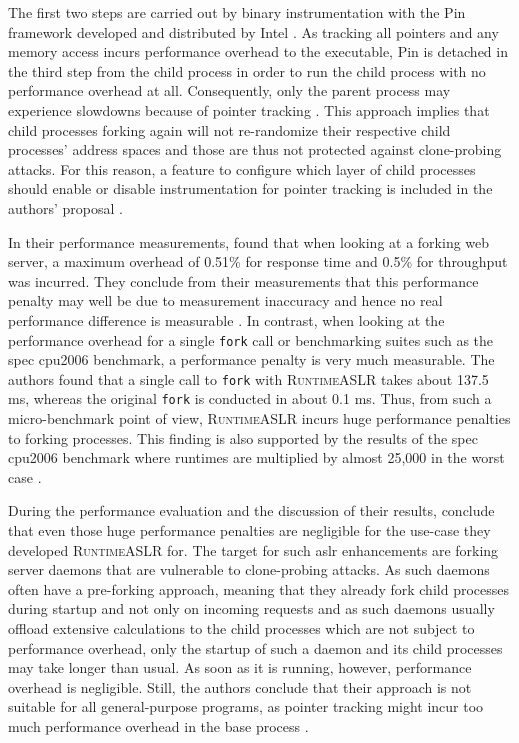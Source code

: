 The first two steps are carried out by binary instrumentation with the Pin framework developed and distributed by Intel \cites{Levi2018}[3\psq]{Lu2016}.
As tracking all pointers and any memory access incurs performance overhead to the executable, Pin is detached in the third step from the child process in order to run the child process with no performance overhead at all.
Consequently, only the parent process may experience slowdowns because of pointer tracking \cite[4,11\psqq]{Lu2016}.
This approach implies that child processes forking again will not re-randomize their respective child processes' address spaces and those are thus not protected against clone-probing attacks.
For this reason, a feature to configure which layer of child processes should enable or disable instrumentation for pointer tracking is included in the authors' proposal \cite[9]{Lu2016}.

In their performance measurements, \citeauthor{Lu2016} found that when looking at a forking web server, a maximum overhead of 0.51\% for response time and 0.5\% for throughput was incurred.
They conclude from their measurements that this performance penalty may well be due to measurement inaccuracy and hence no real performance difference is measurable \cite[11\psq]{Lu2016}.
In contrast, when looking at the performance overhead for a single \texttt{fork} call or benchmarking suites such as the \gls{spec} \acs{cpu}2006 benchmark, a performance penalty is very much measurable.
The authors found that a single call to \texttt{fork} with \textsc{RuntimeASLR} takes about 137.5 ms, whereas the original \texttt{fork} is conducted in about 0.1 ms.
Thus, from such a micro-benchmark point of view, \textsc{RuntimeASLR} incurs huge performance penalties to forking processes.
This finding is also supported by the results of the \gls{spec} \acs{cpu}2006 benchmark where runtimes are multiplied by almost 25,000 in the worst case \cite[12]{Lu2016}.

During the performance evaluation and the discussion of their results, \citeauthor{Lu2016} conclude that even those huge performance penalties are negligible for the use-case they developed \textsc{RuntimeASLR} for.
The target for such \gls{aslr} enhancements are forking server daemons that are vulnerable to clone-probing attacks.
As such daemons often have a pre-forking approach, meaning that they already fork child processes during startup and not only on incoming requests and as such daemons usually offload extensive calculations to the child processes which are not subject to performance overhead, only the startup of such a daemon and its child processes may take longer than usual.
As soon as it is running, however, performance overhead is negligible.
Still, the authors conclude that their approach is not suitable for all general-purpose programs, as pointer tracking might incur too much performance overhead in the base process \cite[12\psq]{Lu2016}.


